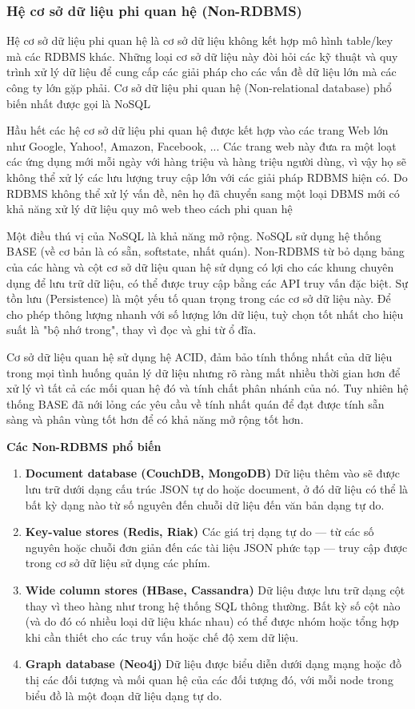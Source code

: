 \subsubsection{Hệ cơ sở dữ liệu phi quan hệ (Non-RDBMS)}
\par
Hệ cơ sở dữ liệu phi quan hệ là cơ sở dữ liệu không kết hợp mô hình table/key mà các RDBMS khác. Những loại cơ sở dữ liệu này đòi hỏi các kỹ thuật và quy trình xử lý dữ liệu để cung cấp các giải pháp cho các vấn đề dữ liệu lớn mà các công ty lớn gặp phải. Cơ sở dữ liệu phi quan hệ (Non-relational database) phổ biến nhất được gọi là NoSQL
\par
Hầu hết các hệ cơ sở dữ liệu phi quan hệ được kết hợp vào các trang Web lớn như Google, Yahoo!, Amazon, Facebook, ... Các trang web này đưa ra một loạt các ứng dụng mới mỗi ngày với hàng triệu và hàng triệu người dùng, vì vậy họ sẽ không thể xử lý các lưu lượng truy cập lớn với các giải pháp RDBMS hiện có. Do RDBMS không thể xử lý vấn đề, nên họ đã chuyển sang một loại DBMS mới có khả năng xử lý dữ liệu quy mô web theo cách phi quan hệ
\par
Một điều thú vị của NoSQL là khả năng mở rộng. NoSQL sử dụng hệ thống BASE (về cơ bản là có sẵn, softstate, nhất quán). Non-RDBMS từ bỏ dạng bảng của các hàng và cột cơ sở dữ liệu quan hệ sử dụng có lợi cho các khung chuyên dụng để lưu trữ dữ liệu, có thể được truy cập bằng các API truy vấn đặc biệt. Sự tồn lưu (Persistence) là một yếu tố quan trọng trong các cơ sở dữ liệu này. Để cho phép thông lượng nhanh với số lượng lớn dữ liệu, tuỳ chọn tốt nhất cho hiệu suất là "bộ nhớ trong", thay vì đọc và ghi từ ổ đĩa.
\par
Cơ sở dữ liệu quan hệ sử dụng hệ ACID, đảm bảo tính thống nhất của dữ liệu trong mọi tình huống quản lý dữ liệu nhưng rõ ràng mất nhiều thời gian hơn để xử lý vì tất cả các mối quan hệ đó và tính chất phân nhánh của nó. Tuy nhiên hệ thống BASE đã nới lỏng các yêu cầu về tính nhất quán để đạt được tính sẵn sàng và phân vùng tốt hơn để có khả năng mở rộng tốt hơn.
\par
\textbf{Các Non-RDBMS phổ biến}
\begin{enumerate}
    \item \textbf{Document database (CouchDB, MongoDB)}
    Dữ liệu thêm vào sẽ được lưu trữ dưới dạng cấu trúc JSON tự do hoặc document, ở đó dữ liệu có thể là bất kỳ dạng nào từ số nguyên đến chuỗi dữ liệu đến văn bản dạng tự do.
    \item \textbf{Key-value stores (Redis, Riak)}
    Các giá trị dạng tự do — từ các số nguyên hoặc chuỗi đơn giản đến các tài liệu JSON phức tạp — truy cập được trong cơ sở dữ liệu sử dụng các phím.
    \item \textbf{Wide column stores (HBase, Cassandra)}
    Dữ liệu được lưu trữ dạng cột thay vì theo hàng như trong hệ thống SQL thông thường. Bất kỳ số cột nào (và do đó có nhiều loại dữ liệu khác nhau) có thể được nhóm hoặc tổng hợp khi cần thiết cho các truy vấn hoặc chế độ xem dữ liệu.
    \item \textbf{Graph database (Neo4j)}
    Dữ liệu được biểu diễn dưới dạng mạng hoặc đồ thị các đối tượng và mối quan hệ của các đối tượng đó, với mỗi node trong biểu đồ là một đoạn dữ liệu dạng tự do.
\end{enumerate}
